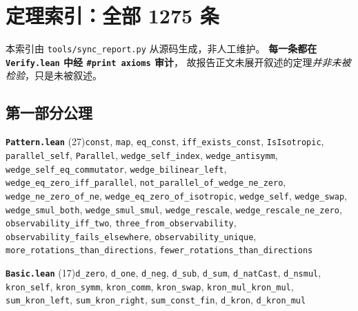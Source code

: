 \documentclass[11pt,a4paper]{article}
\theoremstyle{sudef}
\begin{document}
\clearpage
\appendix
\section{定理索引：全部 1275 条}\label{sec:index}

本索引由 \texttt{tools/sync\_report.py} 从源码生成，非人工维护。
\textbf{每一条都在 \texttt{Verify.lean} 中经 \texttt{\#print axioms} 审计}，
故报告正文未展开叙述的定理\emph{并非未被检验}，只是未被叙述。

\footnotesize
\raggedright

\subsection*{第一部分\quad 公理}
\noindent\textbf{\texttt{Pattern.lean}} (27)\quad \texttt{const}, \texttt{map}, \texttt{eq\_\allowbreak const}, \texttt{iff\_\allowbreak exists\_\allowbreak const}, \texttt{IsIsotropic}, \texttt{parallel\_\allowbreak self}, \texttt{Parallel}, \texttt{wedge\_\allowbreak self\_\allowbreak index}, \texttt{wedge\_\allowbreak antisymm}, \texttt{wedge\_\allowbreak self\_\allowbreak eq\_\allowbreak commutator}, \texttt{wedge\_\allowbreak bilinear\_\allowbreak left}, \texttt{wedge\_\allowbreak eq\_\allowbreak zero\_\allowbreak iff\_\allowbreak parallel}, \texttt{not\_\allowbreak parallel\_\allowbreak of\_\allowbreak wedge\_\allowbreak ne\_\allowbreak zero}, \texttt{wedge\_\allowbreak ne\_\allowbreak zero\_\allowbreak of\_\allowbreak ne}, \texttt{wedge\_\allowbreak eq\_\allowbreak zero\_\allowbreak of\_\allowbreak isotropic}, \texttt{wedge\_\allowbreak self}, \texttt{wedge\_\allowbreak swap}, \texttt{wedge\_\allowbreak smul\_\allowbreak both}, \texttt{wedge\_\allowbreak smul\_\allowbreak smul}, \texttt{wedge\_\allowbreak rescale}, \texttt{wedge\_\allowbreak rescale\_\allowbreak ne\_\allowbreak zero}, \texttt{observability\_\allowbreak iff\_\allowbreak two}, \texttt{three\_\allowbreak from\_\allowbreak observability}, \texttt{observability\_\allowbreak fails\_\allowbreak elsewhere}, \texttt{observability\_\allowbreak unique}, \texttt{more\_\allowbreak rotations\_\allowbreak than\_\allowbreak directions}, \texttt{fewer\_\allowbreak rotations\_\allowbreak than\_\allowbreak directions}\par\smallskip
\noindent\textbf{\texttt{Basic.lean}} (17)\quad \texttt{d\_\allowbreak zero}, \texttt{d\_\allowbreak one}, \texttt{d\_\allowbreak neg}, \texttt{d\_\allowbreak sub}, \texttt{d\_\allowbreak sum}, \texttt{d\_\allowbreak natCast}, \texttt{d\_\allowbreak nsmul}, \texttt{kron\_\allowbreak self}, \texttt{kron\_\allowbreak symm}, \texttt{kron\_\allowbreak comm}, \texttt{kron\_\allowbreak swap}, \texttt{kron\_\allowbreak mul\_\allowbreak kron\_\allowbreak mul}, \texttt{sum\_\allowbreak kron\_\allowbreak left}, \texttt{sum\_\allowbreak kron\_\allowbreak right}, \texttt{sum\_\allowbreak const\_\allowbreak fin}, \texttt{d\_\allowbreak kron}, \texttt{d\_\allowbreak kron\_\allowbreak mul}\par\smallskip
\end{document}
